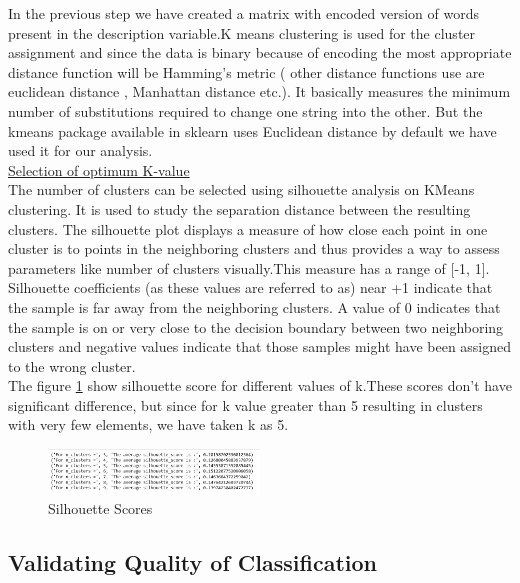 In the previous step we have created a matrix with encoded version of words present in the description variable.K means clustering is used for the cluster assignment and since the data is binary because of encoding the most appropriate distance function will be Hamming's metric ( other distance functions use are euclidean distance , Manhattan distance etc.). It basically measures the minimum number of substitutions required to change one string into the other. But the kmeans package available in sklearn uses Euclidean distance by default we have used it for our analysis.\\

\underline{Selection of optimum K-value}\\

The number of clusters can be selected using silhouette analysis on KMeans clustering. It is used to study the separation distance between the resulting clusters. The silhouette plot displays a measure of how close each point in one cluster is to points in the neighboring clusters and thus provides a way to assess parameters like number of clusters visually.This measure has a range of [-1, 1].\\
Silhouette coefficients (as these values are referred to as) near +1 indicate that the sample is far away from the neighboring clusters. A value of 0 indicates that the sample is on or very close to the decision boundary between two neighboring clusters and negative values indicate that those samples might have been assigned to the wrong cluster.\\

The figure \ref{3.2} show silhouette score for different values of k.These scores don't have significant difference, but since for k value greater than 5 resulting in clusters with very few elements, we have taken k as 5. 

\begin{figure}[h]
\caption{Silhouette Scores}
\label{3.2}
\centering
\includegraphics[width=0.5\textwidth]{images/3_2.PNG}
\end{figure}

\subsection*{Validating Quality of Classification}

